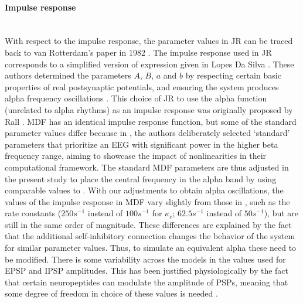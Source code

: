 \documentclass[12pt,twoside]{article}
\begin{document}
\paragraph{Impulse response}~\\ 
With respect to the impulse response, the parameter values in JR can be traced back to van Rotterdam's paper in 1982 \citep{van1982model}. The impulse response used in JR corresponds to a simplified version of expression given in Lopes Da Silva \citep{lopes1974model, da1976models}. These authors determined the parameters $A$, $B$, $a$ and $b$ by respecting certain basic properties of real postsynaptic potentials, and ensuring the system produces alpha frequency oscillations \citep{grimbert2006analysis}. This choice of JR to use the alpha function (unrelated to alpha rhythms) as an impulse response was originally proposed by Rall \citep{rall1967distinguishing}. 
MDF has an identical impulse response function, but some of the standard parameter values differ because in \citet{moran2007neural}, the authors deliberately selected `standard' parameters that prioritize an EEG with significant power in the higher beta frequency range, aiming to showcase the impact of nonlinearities in their computational framework. The standard MDF parameters are thus adjusted in the present study to place the central frequency in the alpha band by using comparable values to \citet{david2003neural}. %
With our adjustments to obtain alpha oscillations, the values of the impulse response in MDF vary slightly from those in \cite{moran2007neural}, such as the rate constants ($250s^{-1}$ instead of $100s^{-1}$ for $\kappa_e$; $62.5s^{-1}$ instead of $50s^{-1}$), but are still in the same order of magnitude. These differences are explained by the fact that the additional self-inhibitory connection changes the behavior of the system for similar parameter values. Thus, to simulate an equivalent alpha these need to be modified.
There is some variability across the models in the values used for EPSP and IPSP amplitudes. This has been justified physiologically by the fact that certain neuropeptides can modulate the amplitude of PSPs, meaning that some degree of freedom in choice of these values is needed \citep{jansen1995electroencephalogram}.
\end{document}
